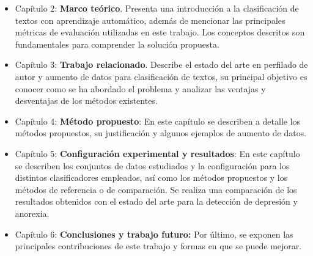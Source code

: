 \begin{itemize}
\item Capítulo 2: \textbf{Marco teórico}. Presenta una introducción a la clasificación de textos con aprendizaje automático, además de mencionar las principales métricas de evaluación utilizadas en este trabajo. Los conceptos descritos son fundamentales para comprender la solución propuesta.


\item Capítulo 3: \textbf{Trabajo relacionado}. Describe el estado del arte en perfilado de autor y aumento de datos para clasificación de textos, su principal objetivo es conocer como se ha abordado el problema y analizar las ventajas y desventajas de los métodos existentes.


\item Capítulo 4: \textbf{Método propuesto}: En este capítulo se describen a detalle los métodos propuestos, su justificación y algunos ejemplos de aumento de datos.

\item Capítulo 5: \textbf{Configuración experimental y resultados}: En este capítulo se describen los conjuntos de datos estudiados y la configuración para los distintos clasificadores empleados, así como los métodos propuestos y los métodos de referencia o de comparación. Se realiza una comparación de los resultados obtenidos con el estado del arte para la detección de depresión y anorexia.

\item Capítulo 6: \textbf{Conclusiones y trabajo futuro:} Por último, se exponen las principales contribuciones de este trabajo y formas en que se puede mejorar.

\end{itemize}

